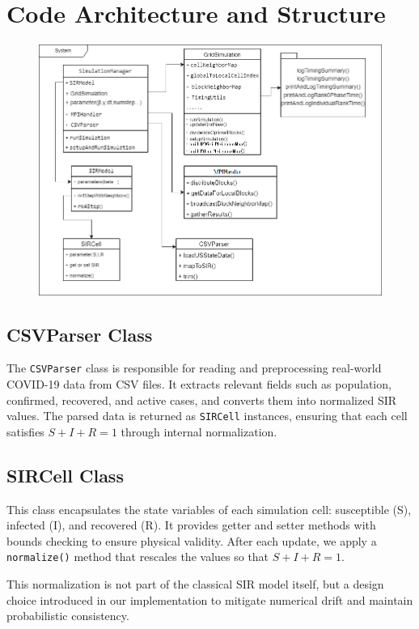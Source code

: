 \section{Code Architecture and Structure}
\begin{figure}[!htb]
    \centering
    \includegraphics[width=12cm]{Images/pic0.png}
\end{figure}


\subsection{CSVParser Class}
The \texttt{CSVParser} class is responsible for reading and preprocessing real-world COVID-19 data from CSV files. It extracts relevant fields such as population, confirmed, recovered, and active cases, and converts them into normalized SIR values. The parsed data is returned as \texttt{SIRCell} instances, ensuring that each cell satisfies \( S + I + R = 1 \) through internal normalization.


\subsection{SIRCell Class}
This class encapsulates the state variables of each simulation cell: susceptible (S), infected (I), and recovered (R). It provides getter and setter methods with bounds checking to ensure physical validity.  
After each update, we apply a \texttt{normalize()} method that rescales the values so that \( S + I + R = 1 \).  

This normalization is not part of the classical SIR model itself, but a design choice introduced in our implementation to mitigate numerical drift and maintain probabilistic consistency.


